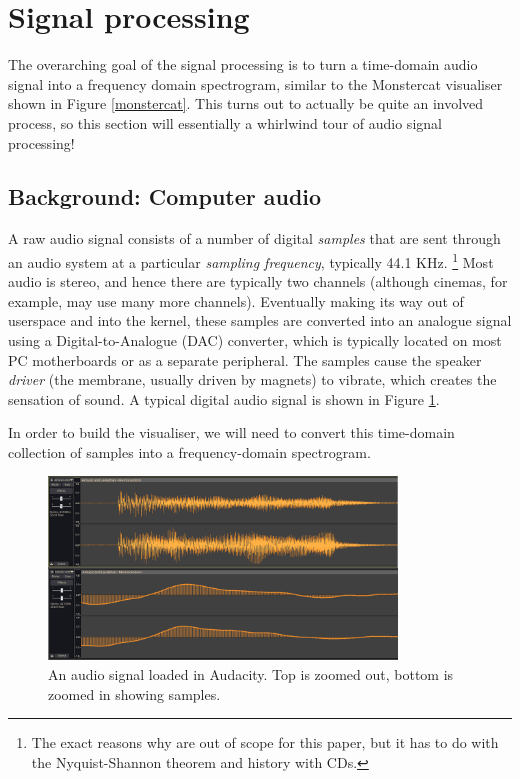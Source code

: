 \documentclass[11pt]{article}
\begin{document}
\clearpage
\section{Signal processing}
The overarching goal of the signal processing is to turn a time-domain audio signal into a frequency domain
spectrogram, similar to the Monstercat visualiser shown in Figure \ref{monstercat}.
This turns out to actually
be quite an involved process, so this section will essentially a whirlwind tour of audio signal processing!

\subsection{Background: Computer audio}
A raw audio signal consists of a number of digital \textit{samples} that are sent through
an audio system at a particular \textit{sampling frequency}, typically 44.1 KHz.
\footnote{The exact reasons why are out of scope for this paper, but it has to do with the Nyquist-Shannon
theorem and history with CDs.}
Most audio is stereo, and hence there are typically two channels (although cinemas, for example, may use many
more channels). Eventually making its way out of userspace and into the kernel, these samples are converted
into an analogue signal using a Digital-to-Analogue (DAC) converter, which is typically located on most PC
motherboards or as a separate peripheral. The samples cause the speaker \textit{driver} (the membrane, usually
driven by magnets) to vibrate, which creates the sensation of sound. A typical digital audio signal is shown
in Figure \ref{fig:audiosignal}.

In order to build the visualiser, we will need to convert this time-domain collection of samples into a
frequency-domain spectrogram.

\begin{figure}[H]
\centering
\includegraphics[width=350px]{img/audiosignal.png}
\caption{An audio signal loaded in Audacity. Top is zoomed out, bottom is zoomed in showing samples.}
\label{fig:audiosignal}
\end{figure}
\end{document}
